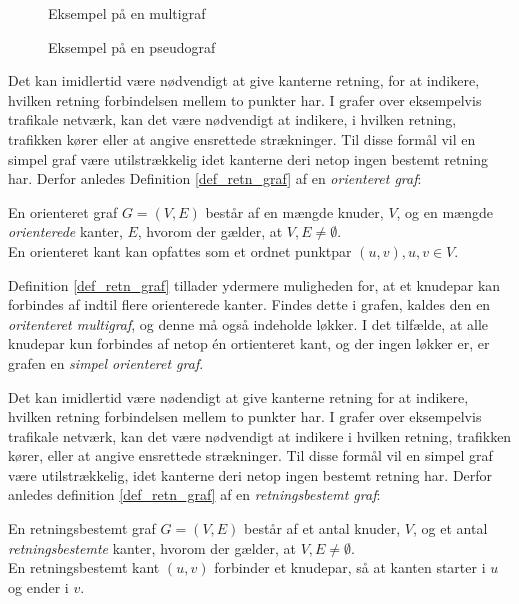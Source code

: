 \begin{figure}[!htb]
   \begin{minipage}{0.48\textwidth}
     \centering
     
     \caption{Eksempel på en multigraf}\label{Fig:Data1}
   \end{minipage}\hfill
   \begin{minipage}{0.48\textwidth}
     \centering
     
     \caption{Eksempel på en pseudograf}\label{Fig:Data2}
   \end{minipage}
\end{figure}


\noindent Det kan imidlertid være nødvendigt at give kanterne retning, for at indikere, hvilken retning forbindelsen mellem to punkter har. I grafer over eksempelvis trafikale netværk, kan det være nødvendigt at indikere, i hvilken retning, trafikken kører eller at angive ensrettede strækninger. Til disse formål vil en simpel graf være utilstrækkelig idet kanterne deri netop ingen bestemt retning har. Derfor anledes Definition \ref{def_retn_graf} 
af en \textit{orienteret graf}:

\begin{defn}
En orienteret graf $G = (V, E)$ består af en mængde knuder, $V$, og en mængde \textit{orienterede} kanter, $E$, hvorom der gælder, at $V, E \neq \emptyset$.\\
En orienteret kant kan opfattes som et ordnet punktpar $(u,v), u,v \in  V$.
\label{def_retn_graf}
\end{defn} 

\noindent Definition \ref{def_retn_graf} tillader ydermere muligheden for, at et knudepar kan forbindes af indtil flere orienterede kanter. Findes dette i grafen, kaldes den en \textit{oritenteret multigraf}, og denne må også indeholde løkker. I det tilfælde, at alle knudepar kun forbindes af netop én ortienteret kant, og der ingen løkker er, er grafen en \textit{simpel orienteret graf}.

\noindent Det kan imidlertid være nødendigt at give kanterne retning for at indikere, hvilken retning forbindelsen mellem to punkter har. I grafer over eksempelvis trafikale netværk, kan det være nødvendigt at indikere i hvilken retning, trafikken kører, eller at angive ensrettede strækninger. Til disse formål vil en simpel graf være utilstrækkelig, idet kanterne deri netop ingen bestemt retning har. Derfor anledes definition \ref{def_retn_graf} 
af en \textit{retningsbestemt graf}:

\begin{defn}
En retningsbestemt graf $G = (V, E)$ består af et antal knuder, $V$, og et antal \textit{retningsbestemte} kanter, hvorom der gælder, at $V, E \neq \emptyset$.\\
En retningsbestemt kant $(u,v)$ forbinder et knudepar, så at kanten starter i $u$ og ender i $v$.
\label{def_retn_graf}
\end{defn} 


